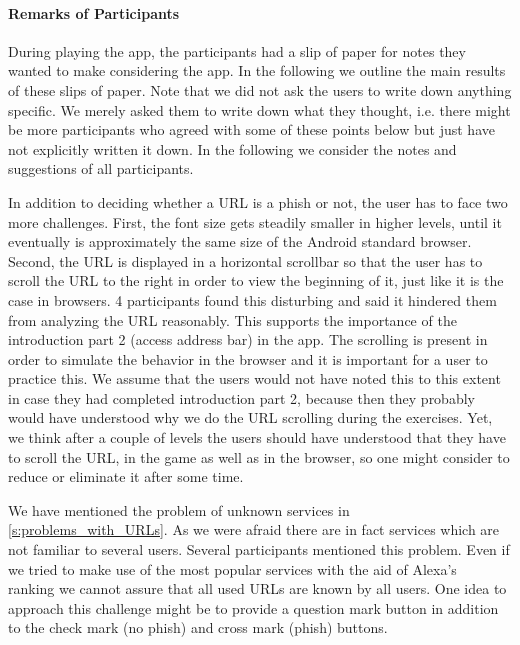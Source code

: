 \paragraph{Remarks of Participants}
\label{s:remarks_of_participants}
During playing the app, the participants had a slip of paper for notes they wanted to make considering the app.
In the following we outline the main results of these slips of paper.
Note that we did not ask the users to write down anything specific. 
We merely asked them to write down what they thought, i.e. there might be more participants who agreed with some of these points below but just have not explicitly written it down.
In the following we consider the notes and suggestions of all participants. 
\begin{description}[leftmargin=0cm]	
	\item[Scrolling of URL:] In addition to deciding whether a URL is a phish or not, the user has to face two more challenges. 
First, the font size gets steadily smaller in higher levels, until it eventually is approximately the same size of the Android standard browser.
Second, the URL is displayed in a horizontal scrollbar so that the user has to scroll the URL to the right in order to view the beginning of it, just like it is the case in browsers.
4 participants found this disturbing and said it hindered them from analyzing the URL reasonably. 
This supports the importance of the introduction part 2 (access address bar) in the app.
The scrolling is present in order to simulate the behavior in the browser and it is important for a user to practice this.
We assume that the users would not have noted this to this extent in case they had completed introduction part 2, because then they probably would have understood why we do the URL scrolling during the exercises.
Yet, we think after a couple of levels the users should have understood that they have to scroll the URL, in the game as well as in the browser, so one might consider to reduce or eliminate it after some time. 
	\item[Unknown Services:] We have mentioned the problem of unknown services in \autoref{s:problems_with_URLs}.
As we were afraid there are in fact services which are not familiar to several users.
Several participants mentioned this problem.
Even if we tried to make use of the most popular services with the aid of Alexa's~\cite{alexa} ranking we cannot assure that all used URLs are known by all users.
One idea to approach this challenge might be to provide a question mark button in addition to the check mark (no phish) and cross mark (phish) buttons. 

\end{description}
